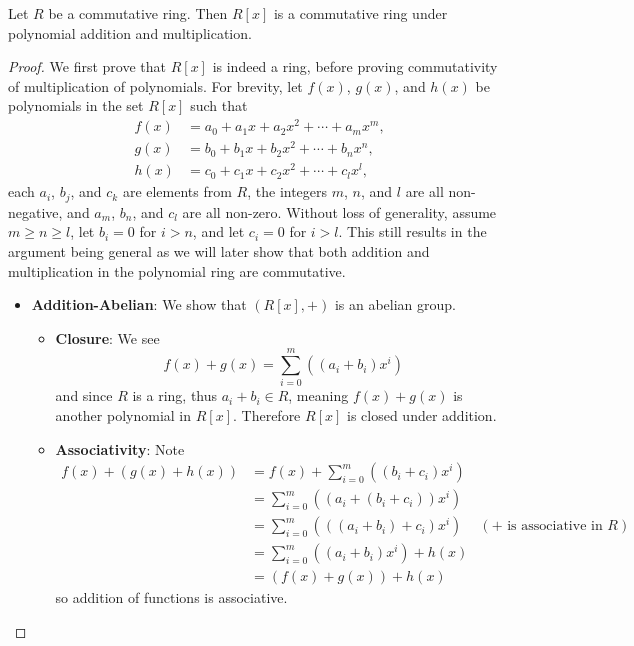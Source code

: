 \begin{proposition}
    Let $R$ be a commutative ring. Then $R[x]$ is a commutative ring under polynomial addition and multiplication.
\end{proposition}
\begin{proof}
    We first prove that $R[x]$ is indeed a ring, before proving commutativity of multiplication of polynomials. For brevity, let $f(x)$, $g(x)$, and $h(x)$ be polynomials in the set $R[x]$ such that
    \begin{align*}
        f(x) &= a_0 + a_1x + a_2x^2 + \cdots + a_mx^m,\\
        g(x) &= b_0 + b_1x + b_2x^2 + \cdots + b_nx^n,\\
        h(x) &= c_0 + c_1x + c_2x^2 + \cdots + c_lx^l,
    \end{align*}
    each $a_i$, $b_j$, and $c_k$ are elements from $R$, the integers $m$, $n$, and $l$ are all non-negative, and $a_m$, $b_n$, and $c_l$ are all non-zero. Without loss of generality, assume $m \geq n \geq l$, let $b_i = 0$ for $i > n$, and let $c_i = 0$ for $i > l$. This still results in the argument being general as we will later show that both addition and multiplication in the polynomial ring are commutative.
    \begin{itemize}
        \item \textbf{Addition-Abelian}: We show that $(R[x], +)$ is an abelian group.
        \begin{itemize}
            \item \textbf{Closure}: We see
            \[
                f(x) + g(x) = \sum_{i=0}^m\left((a_i+b_i)x^i\right)
            \]
            and since $R$ is a ring, thus $a_i+b_i \in R$, meaning $f(x) + g(x)$ is another polynomial in $R[x]$. Therefore $R[x]$ is closed under addition.

            \item \textbf{Associativity}: Note
            \begin{align*}
                f(x) + (g(x) + h(x)) &= f(x) + \sum_{i=0}^m\left((b_i+c_i)x^i\right)\\
                &= \sum_{i=0}^m\left((a_i + (b_i + c_i))x^i\right)\\
                &= \sum_{i=0}^m\left(((a_i + b_i) + c_i)x^i\right) & (+ \text{ is associative in }R)\\
                &= \sum_{i=0}^m\left((a_i+b_i)x^i\right) + h(x)\\
                &= (f(x) + g(x)) + h(x)
            \end{align*}
            so addition of functions is associative.


\end{itemize}
\end{itemize}
\end{proof}
